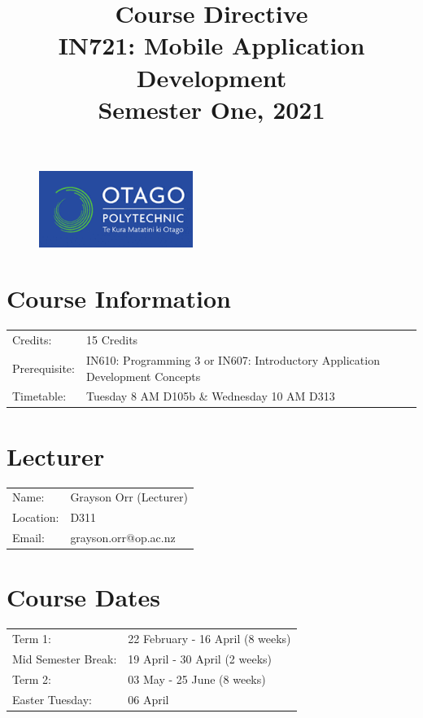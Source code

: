 \documentclass{article}
\author{}
\begin{document}
 

\begin{figure}
	\includegraphics[width=50mm]{./img/logo.png}
\end{figure} 

\title{Course Directive\\IN721: Mobile Application Development\\Semester One, 2021}
\date{}
\maketitle

\section*{Course Information}
\begin{tabular}{ll}
	Credits:                      & 15 Credits                                                                   \\
	Prerequisite:                 & IN610: Programming 3 or IN607: Introductory Application Development Concepts \\
	Timetable:  & Tuesday 8 AM D105b \& Wednesday 10 AM D313                                                         \\
\end{tabular}

\section*{Lecturer}
\begin{tabular}{ll}
	Name:     & Grayson Orr (Lecturer) \\
	Location: & D311                   \\
	Email:    & grayson.orr@op.ac.nz   \\
\end{tabular}

\section*{Course Dates}
\begin{tabular}{ll}
	Term 1:             & 22 February - 16 April (8 weeks) \\
	Mid Semester Break: & 19 April - 30 April (2 weeks)    \\
	Term 2:             & 03 May - 25 June (8 weeks)        \\     
	Easter Tuesday:     & 06 April                             \\                 
\end{tabular}
\end{document}
